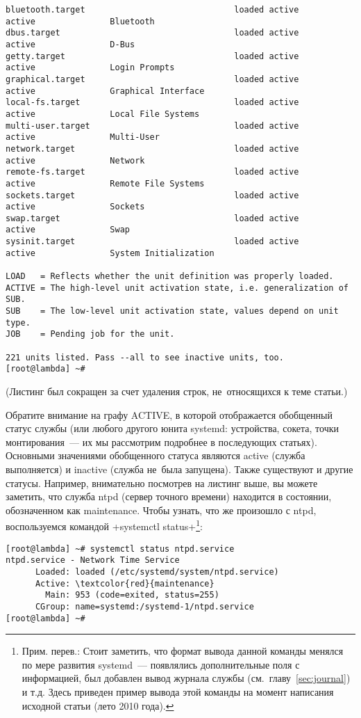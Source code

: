 \documentclass[10pt,oneside,a4paper]{article}
\begin{document}
\begin{landscape}
\begin{Verbatim}[fontsize=\small]
bluetooth.target                              loaded active       active               Bluetooth
dbus.target                                   loaded active       active               D-Bus
getty.target                                  loaded active       active               Login Prompts
graphical.target                              loaded active       active               Graphical Interface
local-fs.target                               loaded active       active               Local File Systems
multi-user.target                             loaded active       active               Multi-User
network.target                                loaded active       active               Network
remote-fs.target                              loaded active       active               Remote File Systems
sockets.target                                loaded active       active               Sockets
swap.target                                   loaded active       active               Swap
sysinit.target                                loaded active       active               System Initialization

LOAD   = Reflects whether the unit definition was properly loaded.
ACTIVE = The high-level unit activation state, i.e. generalization of SUB.
SUB    = The low-level unit activation state, values depend on unit type.
JOB    = Pending job for the unit.

221 units listed. Pass --all to see inactive units, too.
[root@lambda] ~#
\end{Verbatim}
(Листинг был сокращен за счет удаления строк, не~относящихся к теме статьи.)
\end{landscape}

Обратите внимание на графу ACTIVE, в которой отображается обобщенный статус
службы (или любого другого юнита systemd: устройства, сокета, точки
монтирования~--- их мы рассмотрим подробнее в последующих статьях). Основными
значениями обобщенного статуса являются active (служба выполняется) и inactive
(служба не~была запущена). Также существуют и другие статусы. Например,
внимательно посмотрев на листинг выше, вы можете заметить, что служба ntpd
(сервер точного времени) находится в состоянии, обозначенном как maintenance.
Чтобы узнать, что же произошло с ntpd, воспользуемся командой
+systemctl status+\footnote{Прим. перев.: Стоит заметить, что формат вывода
данной команды менялся по мере развития systemd~--- появлялись дополнительные
поля с информацией, был добавлен вывод журнала службы
(см.~главу~\ref{sec:journal}) и т.д. Здесь приведен пример вывода этой команды
на момент написания исходной статьи (лето 2010 года).}: 
\begin{Verbatim}[commandchars=\\\{\}]
[root@lambda] ~# systemctl status ntpd.service
ntpd.service - Network Time Service
	  Loaded: loaded (/etc/systemd/system/ntpd.service)
	  Active: \textcolor{red}{maintenance}
	    Main: 953 (code=exited, status=255)
	  CGroup: name=systemd:/systemd-1/ntpd.service
[root@lambda] ~#
\end{Verbatim}
\end{document}
